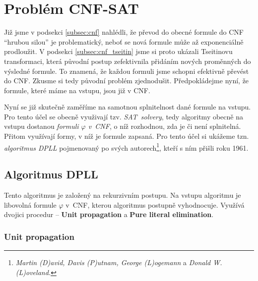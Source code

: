 \section{Problém CNF-SAT}\label{sec:cnf_sat}

Již jsme v podsekci \ref{subsec:cnf} nahlédli, že převod do obecné formule do CNF ``hrubou silou'' je problematický, neboť se nová formule může až exponenciálně prodloužit. V podsekci \ref{subsec:cnf_tseitin} jsme si proto ukázali Tseitinovu transformaci, která původní postup zefektivnila přidáním nových proměnných do výsledné formule. To znamená, že každou formuli jsme schopni efektivně převést do CNF. Zkusme si tedy původní problém zjednodušit. Předpokládejme nyní, že formule, které máme na vstupu, jsou již v CNF.


Nyní se již skutečně zaměříme na samotnou splnitelnost dané formule na vstupu. Pro tento účel se obecně využivají tzv. \emph{SAT~solvery}, tedy algoritmy obecně na vstupu dostanou \emph{formuli $\varphi$ v~CNF}, o níž rozhodnou, zda je či není splnitelná. Přitom využívají formy, v níž je formule zapsaná. Pro tento účel si ukážeme tzn. \emph{algoritmus DPLL} pojmenovaný po svých autorech\footnote{\emph{Martin (D)avid, Davis (P)utnam, George (L)ogemann} a \emph{Donald W. (L)oveland.}}, kteří s ním přišli roku 1961.

\subsection{Algoritmus DPLL}\label{subsec:dpll}

Tento algoritmus je založený na rekurzivním postupu. Na vstupu algoritmu je libovolná formule $\varphi$ v~CNF, kterou algoritmus postupně vyhodnocuje. Využívá dvojici procedur -- \textbf{Unit propagation} a \textbf{Pure literal elimination}.

\subsubsection*{Unit propagation}

